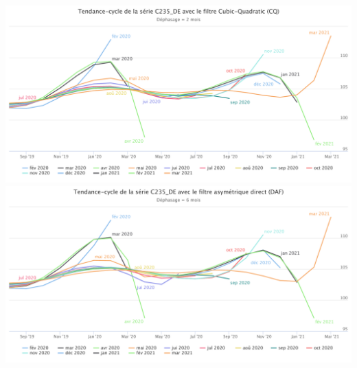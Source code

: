\documentclass[10pt,xcolor=table,color={dvipsnames,usenames},ignorenonframetext,usepdftitle=false,french]{beamer}
\newcommand\1{\mathds{1}}
\begin{document}
\begin{frame}{}
\protect\hypertarget{section-1}{}
\begin{center}\includegraphics[height=0.5\paperheight]{img/simulations/c235_de_cq} \includegraphics[height=0.5\paperheight]{img/simulations/c235_de_daf} \end{center}
\end{frame}
\end{document}
